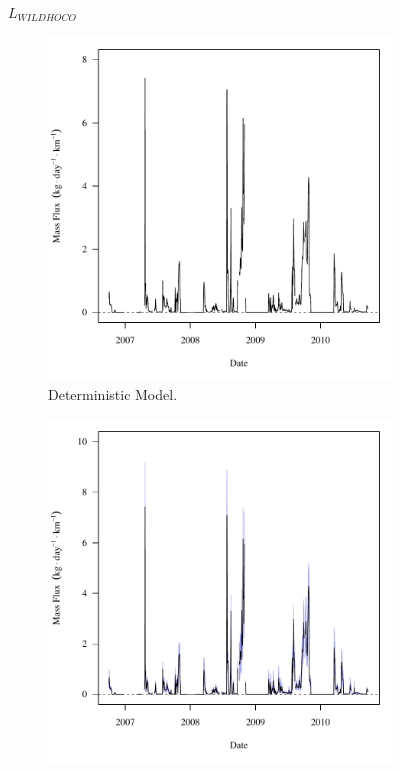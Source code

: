 \subfiguremid
\begin{landscape}
	\begin{figure}
		$ \displaystyle L_{WILDHOCO} $
		\begin{subfigure}{0.7\textwidth}
			\centering
			\includegraphics[width=\tableCustomSize]{"Figures/Results_DSR/Deterministic/f WIL"}
			\caption{Deterministic Model.}
		\end{subfigure}%
		\begin{subfigure}{0.7\textwidth}
			\centering
			\includegraphics[width=\tableCustomSize]{"Figures/Results_DSR/Stochastic/f WIL"}

\end{subfigure}
\end{figure}
\end{landscape}
